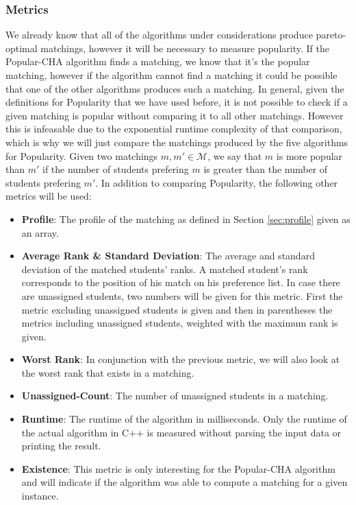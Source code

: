 \subsubsection{Metrics}
We already know that all of the algorithms under considerations produce pareto-optimal matchings, however it will be necessary to measure popularity. If the Popular-CHA algorithm finds a matching, we know that it's the popular matching, however if the algorithm cannot find a matching it could be possible that one of the other algorithms produces such a matching. In general, given the definitions for Popularity that we have used before, it is not possible to check if a given matching is popular without comparing it to all other matchings. However this is infeasable due to the exponential runtime complexity of that comparison, which is why we will just compare the matchings produced by the five algorithms for Popularity. Given two matchings $m, m' \in \mathcal{M}$, we say that $m$ is more popular than $m'$ if the number of students prefering $m$ is greater than the number of students prefering $m'$. 
In addition to comparing Popularity, the following other metrics will be used:
\begin{itemize}
  \item \textbf{Profile}: The profile of the matching as defined in Section \ref{sec:profile} given as an array.
  \item \textbf{Average Rank \& Standard Deviation}: The average and standard deviation of the matched students' ranks. A matched student's rank corresponds to the position of his match on his preference list. In case there are unassigned students, two numbers will be given for this metric. First the metric excluding unassigned students is given and then in parentheses the metrics including unassigned students, weighted with the maximum rank is given.
  \item \textbf{Worst Rank}: In conjunction with the previous metric, we will also look at the worst rank that exists in a matching.
  \item \textbf{Unassigned-Count}: The number of unassigned students in a matching.
  \item \textbf{Runtime}: The runtime of the algorithm in milliseconds. Only the runtime of the actual algorithm in C++ is measured without parsing the input data or printing the result.
  \item \textbf{Existence}: This metric is only interesting for the Popular-CHA algorithm and will indicate if the algorithm was able to compute a matching for a given instance.
\end{itemize}

